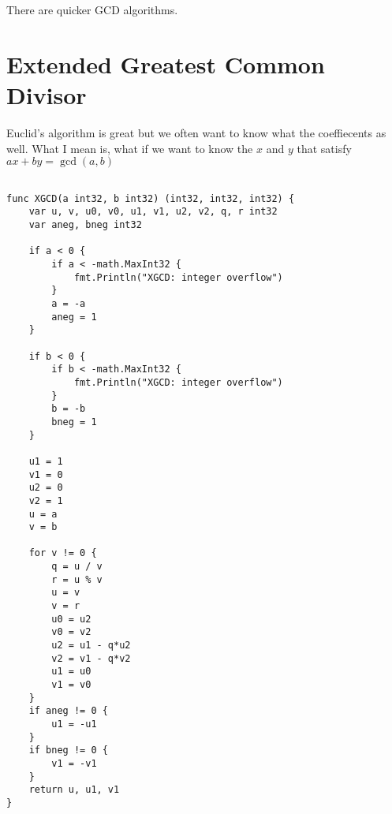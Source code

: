 There are quicker GCD algorithms.

\section{Extended Greatest Common Divisor}
Euclid's algorithm is great but we often want to know what the coeffiecents
as well. What I mean is, what if we want to know the $x$ and $y$ that satisfy
$ax + by = \gcd (a,b)$

\begin{lstlisting}

func XGCD(a int32, b int32) (int32, int32, int32) {
	var u, v, u0, v0, u1, v1, u2, v2, q, r int32
	var aneg, bneg int32

	if a < 0 {
		if a < -math.MaxInt32 {
			fmt.Println("XGCD: integer overflow")
		}
		a = -a
		aneg = 1
	}

	if b < 0 {
		if b < -math.MaxInt32 {
			fmt.Println("XGCD: integer overflow")
		}
		b = -b
		bneg = 1
	}

	u1 = 1
	v1 = 0
	u2 = 0
	v2 = 1
	u = a
	v = b

	for v != 0 {
		q = u / v
		r = u % v
		u = v
		v = r
		u0 = u2
		v0 = v2
		u2 = u1 - q*u2
		v2 = v1 - q*v2
		u1 = u0
		v1 = v0
	}
	if aneg != 0 {
		u1 = -u1
	}
	if bneg != 0 {
		v1 = -v1
	}
	return u, u1, v1
}
\end{lstlisting}
